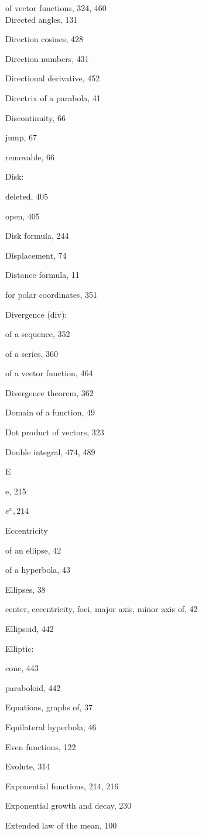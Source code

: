 \documentclass[10pt]{article}
\begin{document}
of vector functions, 324, 460\\
Directed angles, 131

Direction cosines, 428

Direction numbers, 431

Directional derivative, 452

Directrix of a parabola, 41

Discontinuity, 66

jump, 67

removable, 66

Disk:

deleted, 405

open, 405

Disk formula, 244

Displacement, 74

Distance formula, 11

for polar coordinates, 351

Divergence (div):

of a sequence, 352

of a series, 360

of a vector function, 464

Divergence theorem, 362

Domain of a function, 49

Dot product of vectors, 323

Double integral, 474, 489

E

e, 215

$e^{x}, 214$

Eccentricity

of an ellipse, 42

of a hyperbola, 43

Ellipses, 38

center, eccentricity, foci, major axis, minor axis of, 42

Ellipsoid, 442

Elliptic:

cone, 443

paraboloid, 442

Equations, graphs of, 37

Equilateral hyperbola, 46

Even functions, 122

Evolute, 314

Exponential functions, 214, 216

Exponential growth and decay, 230

Extended law of the mean, 100
\end{document}
